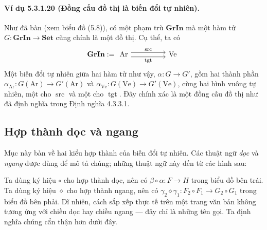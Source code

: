 \paragraph{Ví dụ 5.3.1.20 (Đồng cấu đồ thị là biến đổi tự nhiên).} Như đã bàn (xem biểu đồ (5.8)), có một phạm trù $\mathbf{GrIn}$ mà một hàm tử $G:\mathbf{GrIn}\to\mathbf{Set}$ cũng chính là một đồ thị. Cụ thể, ta có
\[\mathbf{GrIn}:=\begin{tikzcd}[column sep=huge]\mathrm{Ar}\arrow[r,shift left=3pt,"\operatorname{src}"]\arrow[r,shift right=3pt,"\operatorname{tgt}"']&\mathrm{Ve}\end{tikzcd}\]
Một biến đổi tự nhiên giữa hai hàm tử như vậy, $\alpha:G\to G'$, gồm hai thành phần $\alpha_{\mathrm{Ar}}:G(\mathrm{Ar})\to G'(\mathrm{Ar})$ và $\alpha_{\mathrm{Ve}}:G(\mathrm{Ve})\to G'(\mathrm{Ve})$, cùng hai hình vuông tự nhiên, một cho $\operatorname{src}$ và một cho $\operatorname{tgt}$. Đây chính xác là một đồng cấu đồ thị như đã định nghĩa trong Định nghĩa 4.3.3.1.
\subsection{Hợp thành dọc và ngang}
Mục này bàn về hai kiểu hợp thành của biến đổi tự nhiên. Các thuật ngữ \emph{dọc} và \emph{ngang} được dùng để mô tả chúng; những thuật ngữ này đến từ các hình sau:
\begin{center}\end{center}
Ta dùng ký hiệu $\circ$ cho hợp thành dọc, nên có $\beta\circ\alpha:F\to H$ trong biểu đồ bên trái. Ta dùng ký hiệu $\diamond$ cho hợp thành ngang, nên có $\gamma_2\diamond\gamma_1:F_2\circ F_1\to G_2\circ G_1$ trong biểu đồ bên phải. Dĩ nhiên, cách sắp xếp thực tế trên một trang văn bản không tương ứng với chiều dọc hay chiều ngang --- đây chỉ là những tên gọi. Ta định nghĩa chúng cẩn thận hơn dưới đây.
